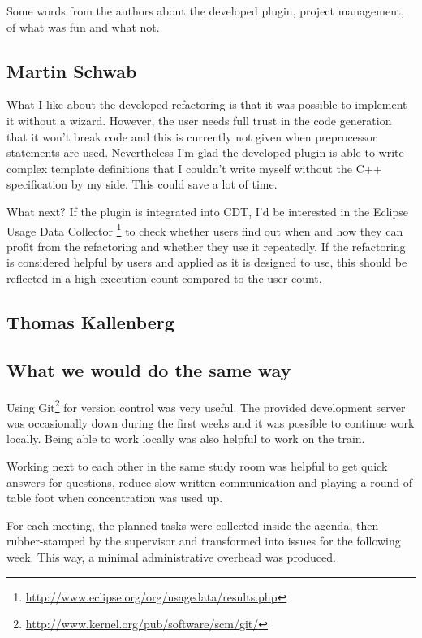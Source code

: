 Some words from the authors about the developed plugin, project management, of 
what was fun and what not.

\subsection{Martin Schwab}

What I like about the developed refactoring is that it was possible to implement 
it without a wizard. However, the user needs full trust in the code generation 
that it won't break code and this is currently not given when preprocessor 
statements are used. Nevertheless I'm glad the developed plugin is able to write 
complex template definitions that I couldn't write myself without the C++ 
specification by my side. This could save a lot of time.

What next? If the plugin is integrated into CDT, I'd be interested in the 
Eclipse Usage Data Collector
\footnote{\url{http://www.eclipse.org/org/usagedata/results.php}} to check 
whether users find out when and how they can profit from the refactoring and 
whether they use it repeatedly. If the refactoring is considered helpful by 
users and applied as it is designed to use, this should be reflected in a high 
execution count compared to the user count.

\subsection{Thomas Kallenberg}


\subsection{What we would do the same way}

Using Git\footnote{\url{http://www.kernel.org/pub/software/scm/git/}} for version 
control was very useful. The provided development server was occasionally down 
during the first weeks and it was possible to continue work locally. Being able 
to work locally was also helpful to work on the train. 

Working next to each other in the same study room was helpful to get quick 
answers for questions, reduce slow written communication and playing a round of 
table foot when concentration was used up.

For each meeting, the planned tasks were collected inside the agenda, then 
rubber-stamped by the supervisor and transformed into issues for the following 
week. This way, a minimal administrative overhead was produced.

